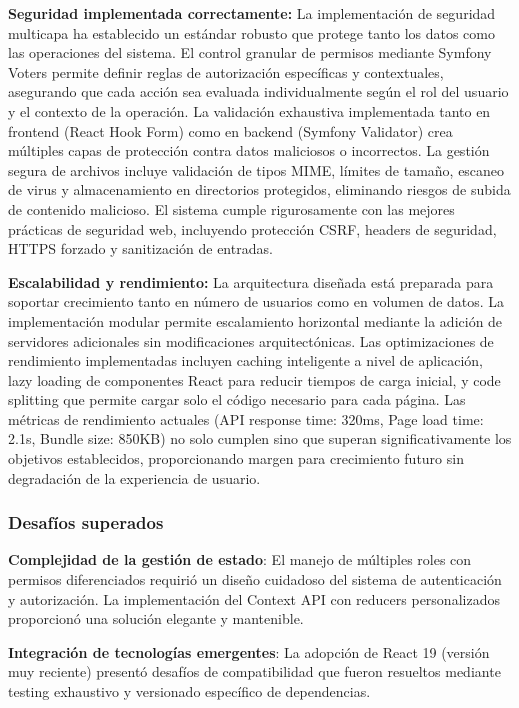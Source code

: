 \documentclass[12pt,a4paper,oneside]{report}
\begin{document}
\textbf{Seguridad implementada correctamente:} La implementación de seguridad multicapa ha establecido un estándar robusto que protege tanto los datos como las operaciones del sistema. El control granular de permisos mediante Symfony Voters permite definir reglas de autorización específicas y contextuales, asegurando que cada acción sea evaluada individualmente según el rol del usuario y el contexto de la operación. La validación exhaustiva implementada tanto en frontend (React Hook Form) como en backend (Symfony Validator) crea múltiples capas de protección contra datos maliciosos o incorrectos. La gestión segura de archivos incluye validación de tipos MIME, límites de tamaño, escaneo de virus y almacenamiento en directorios protegidos, eliminando riesgos de subida de contenido malicioso. El sistema cumple rigurosamente con las mejores prácticas de seguridad web, incluyendo protección CSRF, headers de seguridad, HTTPS forzado y sanitización de entradas.

\textbf{Escalabilidad y rendimiento:} La arquitectura diseñada está preparada para soportar crecimiento tanto en número de usuarios como en volumen de datos. La implementación modular permite escalamiento horizontal mediante la adición de servidores adicionales sin modificaciones arquitectónicas. Las optimizaciones de rendimiento implementadas incluyen caching inteligente a nivel de aplicación, lazy loading de componentes React para reducir tiempos de carga inicial, y code splitting que permite cargar solo el código necesario para cada página. Las métricas de rendimiento actuales (API response time: 320ms, Page load time: 2.1s, Bundle size: 850KB) no solo cumplen sino que superan significativamente los objetivos establecidos, proporcionando margen para crecimiento futuro sin degradación de la experiencia de usuario.

\subsubsection{Desafíos superados}\label{desafuxedos-superados}

\textbf{Complejidad de la gestión de estado}: El manejo de múltiples
roles con permisos diferenciados requirió un diseño cuidadoso del
sistema de autenticación y autorización. La implementación del Context
API con reducers personalizados proporcionó una solución elegante y
mantenible.

\textbf{Integración de tecnologías emergentes}: La adopción de React 19
(versión muy reciente) presentó desafíos de compatibilidad que fueron
resueltos mediante testing exhaustivo y versionado específico de
dependencias.
\end{document}
